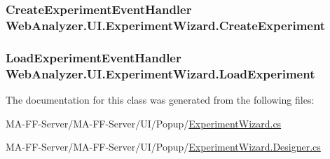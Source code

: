 \subsubsection[{Create\+Experiment}]{\setlength{\rightskip}{0pt plus 5cm}Create\+Experiment\+Event\+Handler Web\+Analyzer.\+U\+I.\+Experiment\+Wizard.\+Create\+Experiment}\label{class_web_analyzer_1_1_u_i_1_1_experiment_wizard_ac18185c9d12c074d2b82c2426e545461}
\hypertarget{class_web_analyzer_1_1_u_i_1_1_experiment_wizard_ad469bc433ee12cf551309f1b2ab37e65}{}
\subsubsection[{Load\+Experiment}]{\setlength{\rightskip}{0pt plus 5cm}Load\+Experiment\+Event\+Handler Web\+Analyzer.\+U\+I.\+Experiment\+Wizard.\+Load\+Experiment}\label{class_web_analyzer_1_1_u_i_1_1_experiment_wizard_ad469bc433ee12cf551309f1b2ab37e65}


The documentation for this class was generated from the following files\+:\begin{DoxyCompactItemize}
\item 
M\+A-\/\+F\+F-\/\+Server/\+M\+A-\/\+F\+F-\/\+Server/\+U\+I/\+Popup/\hyperlink{_experiment_wizard_8cs}{Experiment\+Wizard.\+cs}\item 
M\+A-\/\+F\+F-\/\+Server/\+M\+A-\/\+F\+F-\/\+Server/\+U\+I/\+Popup/\hyperlink{_experiment_wizard_8_designer_8cs}{Experiment\+Wizard.\+Designer.\+cs}\end{DoxyCompactItemize}

